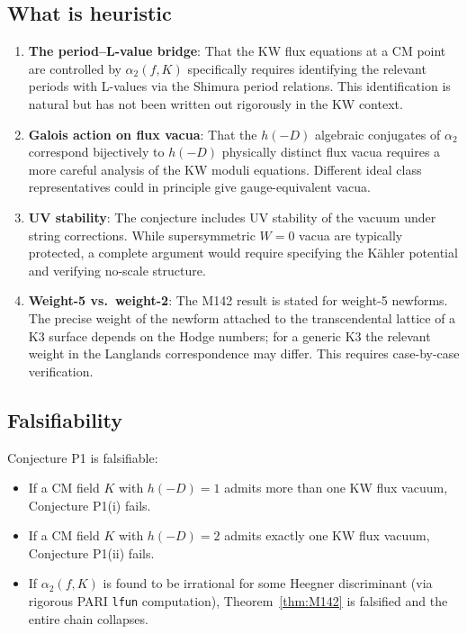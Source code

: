 \documentclass[12pt,a4paper]{article}
\theoremstyle{plain}
\theoremstyle{definition}
\begin{document}
\subsection{What is heuristic}

\begin{enumerate}
  \item \textbf{The period--L-value bridge}: That the KW flux equations at
    a CM point are controlled by $\alpha_2(f,K)$ specifically requires
    identifying the relevant periods with L-values via the Shimura period
    relations. This identification is natural but has not been written out
    rigorously in the KW context.

  \item \textbf{Galois action on flux vacua}: That the $h(-D)$ algebraic
    conjugates of $\alpha_2$ correspond bijectively to $h(-D)$ physically
    distinct flux vacua requires a more careful analysis of the KW moduli
    equations. Different ideal class representatives could in principle
    give gauge-equivalent vacua.

  \item \textbf{UV stability}: The conjecture includes UV stability of the
    vacuum under string corrections. While supersymmetric $W=0$ vacua are
    typically protected, a complete argument would require specifying the
    K\"ahler potential and verifying no-scale structure.

  \item \textbf{Weight-5 vs.\ weight-2}: The M142 result is stated for
    weight-5 newforms. The precise weight of the newform attached to the
    transcendental lattice of a K3 surface depends on the Hodge numbers;
    for a generic K3 the relevant weight in the Langlands correspondence
    may differ. This requires case-by-case verification.
\end{enumerate}

\subsection{Falsifiability}

Conjecture P1 is falsifiable:
\begin{itemize}
  \item If a CM field $K$ with $h(-D) = 1$ admits more than one KW flux
    vacuum, Conjecture P1(i) fails.
  \item If a CM field $K$ with $h(-D) = 2$ admits exactly one KW flux
    vacuum, Conjecture P1(ii) fails.
  \item If $\alpha_2(f,K)$ is found to be irrational for some Heegner
    discriminant (via rigorous PARI \texttt{lfun} computation), Theorem~\ref{thm:M142}
    is falsified and the entire chain collapses.
\end{itemize}
\end{document}
